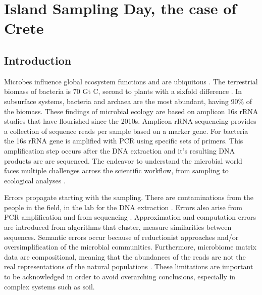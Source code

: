 % 
% 


\chapter{Island Sampling Day, the case of Crete}
\label{cha:isd-crete-soil}


\section{Introduction}\label{intro_isd}

Microbes influence global ecosystem functions \parencite{falkowski2008microbial}
and are ubiquitous \parencite{delgado2016microbial}. The terrestrial biomass of bacteria is
70 Gt C, second to plants with a sixfold difference \parencite{bar2018biomass}. In subsurface systems, bacteria and
archaea are the most abundant, having 90\% of the biomass. These findings of microbial
ecology are based on amplicon 16s rRNA studies that have flourished since the
2010s.
Amplicon rRNA sequencing provides a collection of sequence reads per sample
based on a marker gene. For bacteria the 16s rRNA gene is amplified with PCR 
using specific sets of primers.
This amplification step occurs after the DNA extraction and it's resulting DNA products
are are sequenced.
The endeavor to understand the microbial world faces multiple challenges
across the scientific workflow, from sampling to ecological analyses \parencite{Lee2012}.

Errors propagate starting with the sampling. There are contaminations from the
people in the field, in the lab for the DNA extraction \parencite{EISENHOFER2019105}. 
Errors also arise from PCR amplification and from sequencing \parencite{Schloss2011, Schimer2015}.
Approximation and computation errors are introduced from algorithms that cluster, measure similarities between
sequences. Semantic errors occur because of reductionist approaches and/or oversimplification
of the microbial communities. Furthermore, microbiome matrix data are compositional, 
meaning that the abundances of the reads are not the real representations of the natural populations \parencite{Gloor2017}.
These limitations are important to be acknowledged in order to avoid overarching conclusions,
especially in complex systems such as soil.

